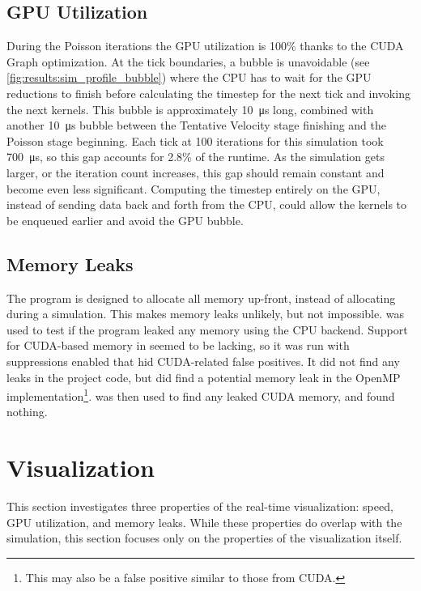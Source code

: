 \clearpage
\pagebreak

\subsection{GPU Utilization}\label{sec:Results:Sim:Efficiency}

During the Poisson iterations the GPU utilization is 100\% thanks to the CUDA Graph optimization.
At the tick boundaries, a bubble is unavoidable (see \cref{fig:results:sim_profile_bubble}) where the CPU has to wait for the GPU reductions to finish before calculating the timestep for the next tick and invoking the next kernels.
This bubble is approximately \SI{10}{\micro\second} long, combined with another \SI{10}{\micro\second} bubble between the Tentative Velocity stage finishing and the Poisson stage beginning.
Each tick at 100 iterations for this simulation took \SI{700}{\micro\second}, so this gap accounts for 2.8\% of the runtime.
As the simulation gets larger, or the iteration count increases, this gap should remain constant and become even less significant.
Computing the timestep entirely on the GPU, instead of sending data back and forth from the CPU, could allow the kernels to be enqueued earlier and avoid the GPU bubble.

\subsection{Memory Leaks}\label{sec:Results:Sim:Mem}
The program is designed to allocate all memory up-front, instead of allocating during a simulation.
This makes memory leaks unlikely, but not impossible.
 was used to test if the program leaked any memory using the CPU backend.
Support for CUDA-based memory in  seemed to be lacking, so it was run with suppressions enabled that hid CUDA-related false positives.
It did not find any leaks in the project code, but did find a potential memory leak in the OpenMP implementation\footnote{This may also be a false positive similar to those from CUDA.}.
 was then used to find any leaked CUDA memory, and found nothing.%

\pagebreak
\section{Visualization}\label{sec:Results:Viz}
This section investigates three properties of the real-time visualization: speed, GPU utilization, and memory leaks.
While these properties do overlap with the simulation, this section focuses only on the properties of the visualization itself.

